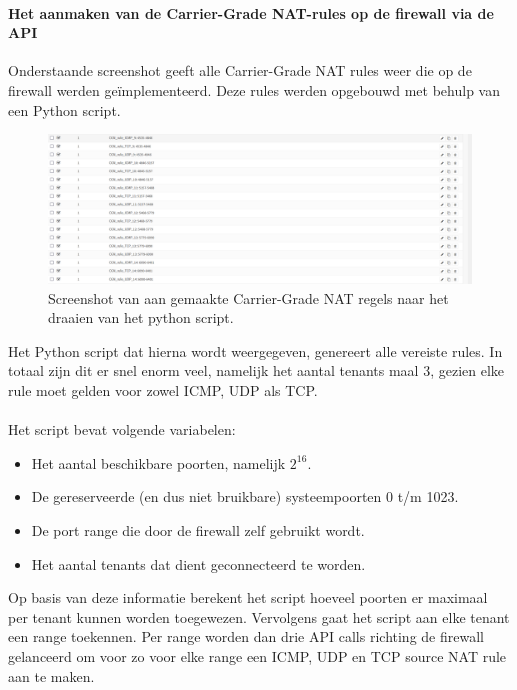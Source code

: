 \paragraph{Het aanmaken van de Carrier-Grade NAT-rules op de firewall via de API}
Onderstaande screenshot geeft alle Carrier-Grade NAT rules weer die op de firewall werden geïmplementeerd. Deze rules werden opgebouwd met behulp van een Python script.

\begin{figure}[H]
    \includegraphics[width=\textwidth]{graphics/opnsense_cgnat_rules.PNG}
    \caption[OPNsense met CGN regels]{Screenshot van aan gemaakte Carrier-Grade NAT regels naar het draaien van het python script.}
    \label{fig:FirewallCGNRules}
\end{figure}

Het Python script dat hierna wordt weergegeven, genereert alle vereiste rules. In totaal zijn dit er snel enorm veel, namelijk het aantal tenants maal 3, gezien elke rule moet gelden voor zowel ICMP, UDP als TCP.

\paragraph{}
Het script bevat volgende variabelen:

\begin{itemize}
    \item Het aantal beschikbare poorten, namelijk $2^{16}$.
    \item De gereserveerde (en dus niet bruikbare) systeempoorten 0 t/m 1023.
    \item De port range die door de firewall zelf gebruikt wordt.
    \item Het aantal tenants dat dient geconnecteerd te worden.
\end{itemize}

Op basis van deze informatie berekent het script hoeveel poorten er maximaal per tenant kunnen worden toegewezen.
Vervolgens gaat het script aan elke tenant een range toekennen.
Per range worden dan drie API calls richting de firewall gelanceerd om voor zo voor elke range een ICMP, UDP en TCP source NAT rule aan te maken.


